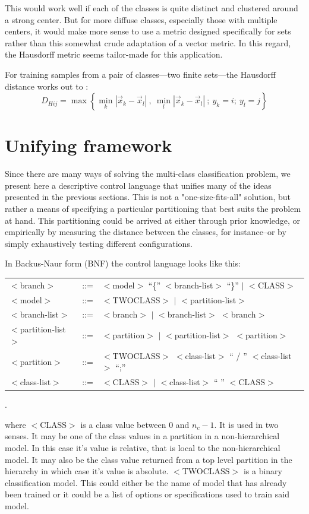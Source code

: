\documentclass{article}
\newenvironment{eqnnon}{\begin{equation*}}{\end{equation*}}
\begin{document}
This would work well if each of the classes is quite distinct and clustered around a strong center.
But for more diffuse classes, especially those with multiple centers, it would make more sense to use a metric designed specifically for sets rather than this somewhat crude adaptation of a vector metric.
In this regard, the Hausdorff metric seems tailor-made for this application.

For training samples from a pair of classes---two finite sets---the Hausdorff distance works out to \citep{Ott1993, Gulick1992}:
\begin{eqnnon}
D_{Hij} = \max \left \lbrace \min_k | \vec x_k - \vec x_l|~,~\min_l | \vec x_k - \vec x_l| ~ ;~y_k=i;~y_l=j \right \rbrace
\end{eqnnon}

\section{Unifying framework}

Since there are many ways of solving the multi-class classification problem,
we present here a descriptive control language that unifies many of the ideas
presented in the previous sections.
This is not a "one-size-fits-all" solution, but rather a means of specifying
a particular partitioning that best suits the problem at hand.
This partitioning could be arrived at either through prior knowledge, 
or empirically by measuring the distance between the classes, for instance--or
by simply exhaustively testing different configurations.

In Backus-Naur form (BNF) the control language looks like this:

\begin{tabular}{lcl}
$<$branch$>$ & ::= & $<$model$>$ ``\{'' $<$branch-list$>$ ``\}'' $|$ $<$CLASS$>$\\
$<$model$>$  & ::= & $<$TWOCLASS$>$ $|$ $<$partition-list$>$\\
$<$branch-list$>$ & ::= & $<$branch$>$ $|$ $<$branch-list$>$ $<$branch$>$\\
$<$partition-list$>$ & ::= & $<$partition$>$ $|$ $<$partition-list$>$ $<$partition$>$\\
$<$partition$>$ & ::= & $<$TWOCLASS$>$ $<$class-list$>$ `` / '' $<$class-list$>$ ``;''\\
$<$class-list$>$ & ::= & $<$CLASS$>$ $|$ $<$class-list$>$ `` '' $<$CLASS$>$
\end{tabular}.

where $<$CLASS$>$ is a class value between 0 and $n_c-1$.  It is used in two senses.
It may be one of the class values in a partition in a non-hierarchical model.
In this case it's value is relative, that is local to the non-hierarchical model.
It may also be the class value returned
from a top level partition in the hierarchy in which case it's value is absolute.
$<$TWOCLASS$>$ is a binary classification model.
This could either be the name of model that has already been trained or it
could be a list of options or specifications used to train said model.
\end{document}
